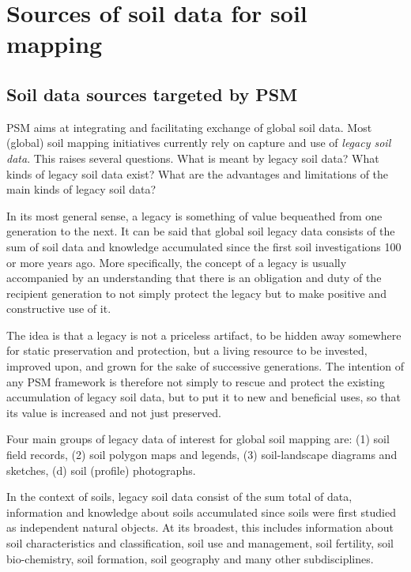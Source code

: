 \documentclass[graybox,natbib,nospthms,UStrade]{svmono}
\let\BeginKnitrBlock\begin \let\EndKnitrBlock\end
\let\BeginKnitrBlock\begin \let\EndKnitrBlock\end
\begin{document}
\hypertarget{sources-of-soil-data-for-soil-mapping}{%
\section{Sources of soil data for soil mapping}\label{sources-of-soil-data-for-soil-mapping}}

\hypertarget{soil-data-sources-targeted-by-psm}{%
\subsection{Soil data sources targeted by PSM}\label{soil-data-sources-targeted-by-psm}}

PSM aims at integrating and facilitating exchange of global soil data.
Most (global) soil mapping initiatives currently rely on capture and use
of \emph{legacy soil data}. This raises several questions. What is meant by
legacy soil data? What kinds of legacy soil data exist? What are the
advantages and limitations of the main kinds of legacy soil data?

In its most general sense, a legacy is something of value bequeathed
from one generation to the next. It can be said that global soil legacy
data consists of the sum of soil data and knowledge accumulated since
the first soil investigations 100 or more years ago. More specifically,
the concept of a legacy is usually accompanied by an understanding that
there is an obligation and duty of the recipient generation to not
simply protect the legacy but to make positive and constructive use of
it.

The idea is that a legacy is not a priceless artifact, to be hidden away
somewhere for static preservation and protection, but a living resource
to be invested, improved upon, and grown for the sake of successive
generations. The intention of any PSM framework is therefore not simply
to rescue and protect the existing accumulation of legacy soil data, but
to put it to new and beneficial uses, so that its value is increased and
not just preserved.

\BeginKnitrBlock{rmdnote}
Four main groups of legacy data of
interest for global soil mapping are: (1) soil field records, (2) soil
polygon maps and legends, (3) soil-landscape diagrams and sketches, (d)
soil (profile) photographs.
\EndKnitrBlock{rmdnote}

In the context of soils, legacy soil data consist of the sum total of
data, information and knowledge about soils accumulated since soils were
first studied as independent natural objects. At its broadest, this
includes information about soil characteristics and classification, soil
use and management, soil fertility, soil bio-chemistry, soil formation,
soil geography and many other subdisciplines.
\end{document}
